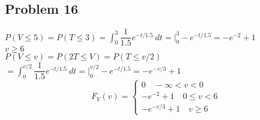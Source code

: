\documentclass{article}
\begin{document}
\begin{flushleft}
\section*{Problem 16}
$P(V\leq 5)=P(T\leq 3)=\int_{0}^{3}\dfrac{1}{1.5}e^{-t/1.5}\ dt=\big|_0^3 -e^{-t/1.5}=-e^{-2}+1$\\
$v\geq 6$\\
$P(V\leq v)=P(2T\leq V)= P(T\leq v/2)$\\
$=\int_{0}^{v/2}\dfrac{1}{1.5}e^{-t/1.5}\ dt=\big|_0^{v/2} -e^{-t/1.5}=-e^{-v/3}+1$\\
\[F_V(v)=\begin{cases}
0 \quad -\infty<v<0\\
-e^{-2}+1 \quad 0\leq v<6\\
-e^{-v/3}+1 \quad v\geq 6
\end{cases}
\]
\end{flushleft}
\end{document}
